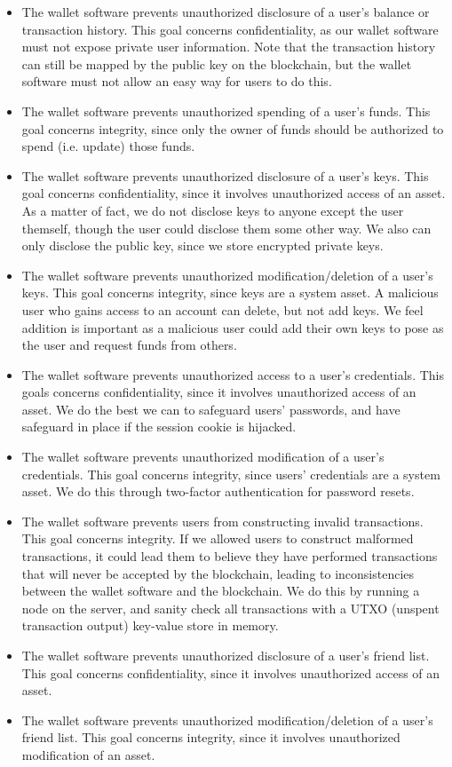 \documentclass[12pt]{article}
\begin{document}
\begin{itemize}
\item The wallet software prevents unauthorized disclosure of a user's balance or transaction history. This goal concerns confidentiality, as our wallet software must not expose private user information. Note that the transaction history can still be mapped by the public key on the blockchain, but the wallet software must not allow an easy way for users to do this.
\item The wallet software prevents unauthorized spending of a user's funds. This goal concerns integrity, since only the owner of funds should be authorized to spend (i.e. update) those funds.
\item The wallet software prevents unauthorized disclosure of a user's keys. This goal concerns confidentiality, since it involves unauthorized access of an asset. As a matter of fact, we do not disclose keys to anyone except the user themself, though the user could disclose them some other way. We also can only disclose the public key, since we store encrypted private keys.
\item The wallet software prevents unauthorized modification/deletion of a user's keys. This goal concerns integrity, since keys are a system asset. A malicious user who gains access to an account can delete, but not add keys. We feel addition is important as a malicious user could add their own keys to pose as the user and request funds from others.
\item The wallet software prevents unauthorized access to a user's credentials. This goals concerns confidentiality, since it involves unauthorized access of an asset. We do the best we can to safeguard users' passwords, and have safeguard in place if the session cookie is hijacked.
\item The wallet software prevents unauthorized modification of a user's credentials. This goal concerns integrity, since users' credentials are a system asset. We do this through two-factor authentication for password resets.
\item The wallet software prevents users from constructing invalid transactions. This goal concerns integrity. If we allowed users to construct malformed transactions, it could lead them to believe they have performed transactions that will never be accepted by the blockchain, leading to inconsistencies between the wallet software and the blockchain. We do this by running a node on the server, and sanity check all transactions with a UTXO (unspent transaction output) key-value store in memory.
\item The wallet software prevents unauthorized disclosure of a user's friend list. This goal concerns confidentiality, since it involves unauthorized access of an asset.
\item The wallet software prevents unauthorized modification/deletion of a user's friend list. This goal concerns integrity, since it involves unauthorized modification of an asset.
\end{itemize}
\end{document}
